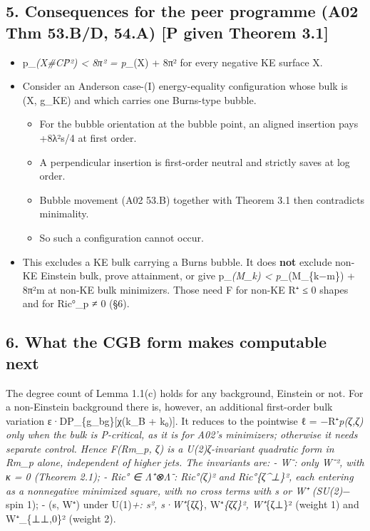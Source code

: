 \documentclass[
  10pt,
]{report}
\providecommand{\tightlist}{%
  \setlength{\itemsep}{0pt}\setlength{\parskip}{0pt}}
\begin{document}
\hypertarget{consequences-for-the-peer-programme-a02-thm-53.bd-54.a-p-given-theorem-3.1}{%
\subsection{5. Consequences for the peer programme (A02 Thm 53.B/D,
54.A) {[}P given Theorem
3.1{]}}\label{consequences-for-the-peer-programme-a02-thm-53.bd-54.a-p-given-theorem-3.1}}

\begin{itemize}
\tightlist
\item
  p\_\emph{(X\#CP̄²) \textless{} 8π² = p\_}(X) + 8π² for every negative
  KE surface X.
\item
  Consider an Anderson case-(I) energy-equality configuration whose bulk
  is (X, g\_KE) and which carries one Burns-type bubble.

  \begin{itemize}
  \tightlist
  \item
    For the bubble orientation at the bubble point, an aligned insertion
    pays +8λ²\textbar s\textbar/4 at first order.
  \item
    A perpendicular insertion is first-order neutral and strictly saves
    at log order.
  \item
    Bubble movement (A02 53.B) together with Theorem 3.1 then
    contradicts minimality.
  \item
    So such a configuration cannot occur.
  \end{itemize}
\item
  This excludes a KE bulk carrying a Burns bubble. It does \textbf{not}
  exclude non-KE Einstein bulk, prove attainment, or give
  p\_\emph{(M\_k) \textless{} p\_}(M\_\{k−m\}) + 8π²m at non-KE bulk
  minimizers. Those need F for non-KE R⁺ ≤ 0 shapes and for Ric°\_p ≠ 0
  (§6).
\end{itemize}

\hypertarget{what-the-cgb-form-makes-computable-next}{%
\subsection{6. What the CGB form makes computable
next}\label{what-the-cgb-form-makes-computable-next}}

The degree count of Lemma 1.1(c) holds for any background, Einstein or
not. For a non-Einstein background there is, however, an additional
first-order bulk variation ε·DP\_\{g\_bg\}{[}χ(k\_B + k₀){]}. It reduces
to the pointwise ℓ = −R⁺\emph{p(ζ,ζ) only when the bulk is P-critical,
as it is for A02's minimizers; otherwise it needs separate control.
Hence F(Rm\_p, ζ) is a U(2)\emph{ζ-invariant quadratic form in Rm\_p
alone, independent of higher jets. The invariants are: - W⁻: only
\textbar W⁻\textbar², with κ = 0 (Theorem 2.1); - Ric° ∈ Λ⁺⊗Λ⁻:
\textbar Ric°(ζ)\textbar² and \textbar Ric°}\{ζ\^{}⊥\}\textbar², each
entering as a nonnegative minimized square, with no cross terms with s
or W⁺ (SU(2)}− spin 1); - (s, W⁺) under U(1)\emph{+: s², s·W⁺}\{ζζ\},
W⁺\emph{\{ζζ\}², \textbar W⁺}\{ζ⊥\}\textbar² (weight 1) and
\textbar W⁺\_\{⊥⊥,0\}\textbar² (weight 2).
\end{document}
